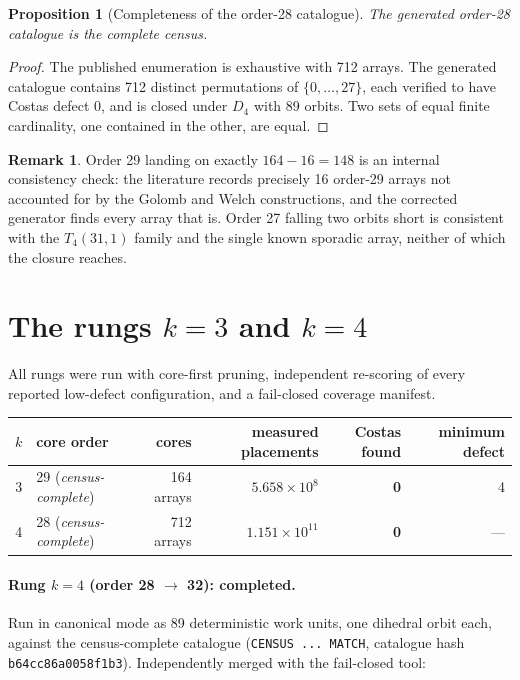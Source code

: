 \documentclass[11pt,a4paper,oneside]{report}
\newtheorem{proposition}[theorem]{Proposition}
\theoremstyle{definition}
\newtheorem{remark}[theorem]{Remark}
\begin{document}
\begin{proposition}[Completeness of the order-28 catalogue]
The generated order-28 catalogue is the complete census.
\end{proposition}
\begin{proof}
The published enumeration is exhaustive with 712 arrays. The generated
catalogue contains 712 distinct permutations of $\{0,\dots,27\}$, each verified
to have Costas defect 0, and is closed under $D_4$ with 89 orbits. Two sets of
equal finite cardinality, one contained in the other, are equal.
\end{proof}

\begin{remark}
Order 29 landing on exactly $164-16=148$ is an internal consistency check: the
literature records precisely 16 order-29 arrays not accounted for by the
Golomb and Welch constructions, and the corrected generator finds every array
that is. Order 27 falling two orbits short is consistent with the $T_4(31,1)$
family and the single known sporadic array, neither of which the closure
reaches.
\end{remark}

\section{The rungs $k=3$ and $k=4$}
\label{p3-sec:rungs}

All rungs were run with core-first pruning, independent re-scoring of every
reported low-defect configuration, and a fail-closed coverage manifest.

\begin{center}
\begin{tabular}{@{}rlrrrr@{}}
\toprule
$k$ & core order & cores & measured placements & Costas found & minimum defect \\
\midrule
3 & 29 (\emph{census-complete}) & 164 arrays & $5.658\times10^{8}$ & \textbf{0} & 4 \\
4 & 28 (\emph{census-complete}) & 712 arrays & $1.151\times10^{11}$ & \textbf{0} & --- \\
\bottomrule
\end{tabular}
\end{center}

\paragraph{Rung $k=4$ (order 28 $\to$ 32): completed.}
Run in canonical mode as 89 deterministic work units, one dihedral orbit each,
against the census-complete catalogue (\texttt{CENSUS ... MATCH}, catalogue hash
\texttt{b64cc86a0058f1b3}). Independently merged with the fail-closed tool:
\end{document}
